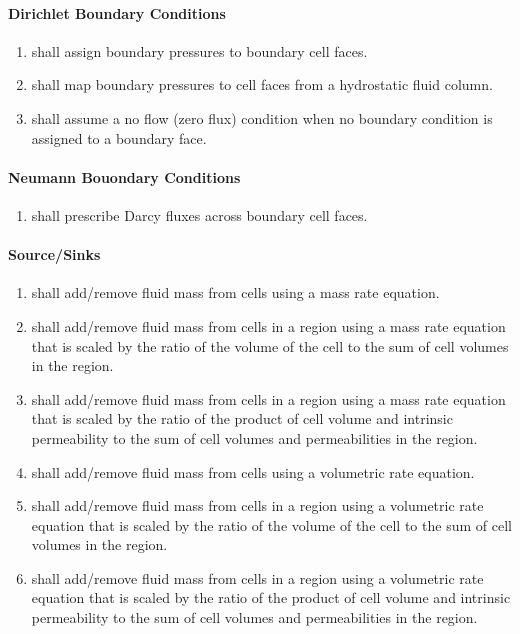 \paragraph{Dirichlet Boundary Conditions}
\begin{enumerate}[resume]
	\item \label{fluidDirichletBC} \pft shall assign boundary pressures to boundary cell faces. 
	\item \label{fluidHydrostaticBC} \pft shall map boundary pressures to cell faces from a hydrostatic fluid column.
	\hydrostatictext
	\item \label{FRnoFlow} \pft shall assume a no flow (zero flux) condition when no boundary condition is assigned to a boundary face.
\end{enumerate}

\paragraph{Neumann Bouondary Conditions}
\begin{enumerate}[resume]
	\item \label{fluidNeumannBC} \pft shall prescribe Darcy fluxes across boundary cell faces.
\end{enumerate}

\paragraph{Source/Sinks}
\begin{enumerate}[label=FR \arabic*.,ref=FR \arabic*,nosep, resume]
	\item \label{fluidMassRateSS} \pft shall add/remove fluid mass from cells using a mass rate equation.
	\item \label{fluidScaledMassRateVolSS} \pft shall add/remove fluid mass from cells in a region using a mass rate equation that is scaled by the ratio of the volume of the cell to the sum of cell volumes in the region.
	\item \label{fluidScaledMassRatePermSS} \pft shall add/remove fluid mass from cells in a region using a mass rate equation that is scaled by the ratio of the product of cell volume and intrinsic permeability to the sum of cell volumes and permeabilities in the region.
	\item \label{fluidVolRateSS} \pft shall add/remove fluid mass from cells using a volumetric rate equation.
	\item \label{fluidScaledVolRateVolSS} \pft shall add/remove fluid mass from cells in a region using a volumetric rate equation that is scaled by the ratio of the volume of the cell to the sum of cell volumes in the region.
	\item \label{fluidScaledVolRatePermSS} \pft shall add/remove fluid mass from cells in a region using a volumetric rate equation that is scaled by the ratio of the product of cell volume and intrinsic permeability to the sum of cell volumes and permeabilities in the region.
\end{enumerate}

